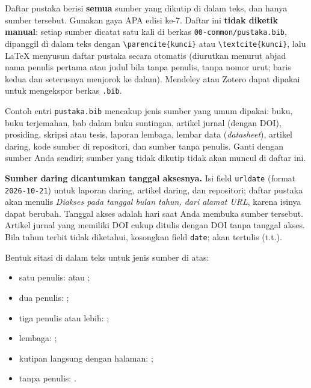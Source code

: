 Daftar pustaka berisi \textbf{semua} sumber yang dikutip di dalam teks, dan hanya sumber tersebut. Gunakan gaya APA edisi ke-7. Daftar ini \textbf{tidak diketik manual}: setiap sumber dicatat satu kali di berkas \texttt{00-common/pustaka.bib}, dipanggil di dalam teks dengan \verb|\parencite{kunci}| atau \verb|\textcite{kunci}|, lalu LaTeX menyusun daftar pustaka secara otomatis (diurutkan menurut abjad nama penulis pertama atau judul bila tanpa penulis, tanpa nomor urut; baris kedua dan seterusnya menjorok ke dalam). Mendeley atau Zotero dapat dipakai untuk mengekspor berkas \texttt{.bib}.

Contoh entri \texttt{pustaka.bib} mencakup jenis sumber yang umum dipakai: buku, buku terjemahan, bab dalam buku suntingan, artikel jurnal (dengan DOI), prosiding, skripsi atau tesis, laporan lembaga, lembar data (\textit{datasheet}), artikel daring, kode sumber di repositori, dan sumber tanpa penulis. Ganti dengan sumber Anda sendiri; sumber yang tidak dikutip tidak akan muncul di daftar ini.

\textbf{Sumber daring dicantumkan tanggal aksesnya.} Isi field \texttt{urldate} (format \texttt{2026-10-21}) untuk laporan daring, artikel daring, dan repositori; daftar pustaka akan menulis \textit{Diakses pada tanggal bulan tahun, dari alamat URL}, karena isinya dapat berubah. Tanggal akses adalah hari saat Anda membuka sumber tersebut. Artikel jurnal yang memiliki DOI cukup ditulis dengan DOI tanpa tanggal akses. Bila tahun terbit tidak diketahui, kosongkan field \texttt{date}; akan tertulis (t.t.).

Bentuk sitasi di dalam teks untuk jenis sumber di atas:
\begin{itemize}
\item satu penulis: \textcite{andrews2007} atau \parencite{andrews2007};
\item dua penulis: \parencite{xu2012};
\item tiga penulis atau lebih: \parencite{capozzi2013};
\item lembaga: \parencite{bps1997};
\item kutipan langsung dengan halaman: \parencite[15]{ghosh2010};
\item tanpa penulis: \parencite{panduan2020}.
\end{itemize}

\nocite{penulis2020,penulis2022,penulis2024,penulis2026,penulis2024kode,komdigi2025}

\begin{daftarpustaka}
\printbibliography[heading=none]
\end{daftarpustaka}
